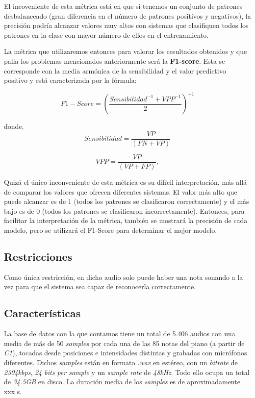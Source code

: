 \documentclass[12pt]{article}
\begin{document}
\smallskip
El incoveniente de esta métrica está en que si tenemos un conjunto de patrones desbalanceado (gran diferencia en el número de
patrones positivos y negativos), la precisión podría alcanzar valores muy altos con sistemas que clasifiquen todos los patrones en la clase con mayor número de ellos
en el entrenamiento.

\bigskip
La métrica que utilizaremos entonces para valorar los resultados obtenidos y que palia los problemas
mencionados anteriormente será la \textbf{F1-score}. Esta se corresponde con la media armónica de la sensibilidad y el
valor predictivo positivo y está caracterizada por la fórmula: 

\begin{equation}
	F1-Score = \left(\frac{Sensibilidad^{-1} + VPP^{-1}}{2}\right)^{-1}
\end{equation}

donde, 
\begin{equation}
	Sensibilidad = \frac{VP}{(FN + VP)}
\end{equation}

\begin{equation}
	VPP = \frac{VP}{(VP + FP)}, 
\end{equation}

\smallskip
Quizá el único inconveniente de esta métrica es su difícil interpretación, más allá de comparar los valores que ofrecen diferentes sistemas.
El valor más alto que puede alcanzar es de 1 (todos los patrones se clasificaron correctamente) y el más bajo es de 0 (todos los patrones se clasificaron
incorrectamente). Entonces, para facilitar la interpretación de la métrica, también se mostrará la precisión de cada modelo, pero se utilizará
el F1-Score para determinar el mejor modelo.

\subsection{Restricciones}
\bigskip
Como única restricción, en dicho audio solo puede haber una nota sonando a la vez para que el sistema sea capaz de reconocerla correctamente.

\subsection{Características}
\bigskip
La base de datos con la que contamos tiene un total de 5.406 audios con una media de más de 50 \textit{samples} por cada una de las 85 notas del piano (a partir de \textit{C1}), tocadas
desde posiciones e intensidades distintas y grabadas con micrófonos diferentes. Dichos \textit{samples} están en formato \textit{.wav} en estéreo, con un 
\textit{bitrate} de \textit{2304kbps}, \textit{24 bits per sample} y un \textit{sample rate} de \textit{48kHz}. Todo ello ocupa un total de \textit{34.5GB} en disco.
La duración media de los \textit{samples} es de aproximadamente xxx s.
\end{document}
